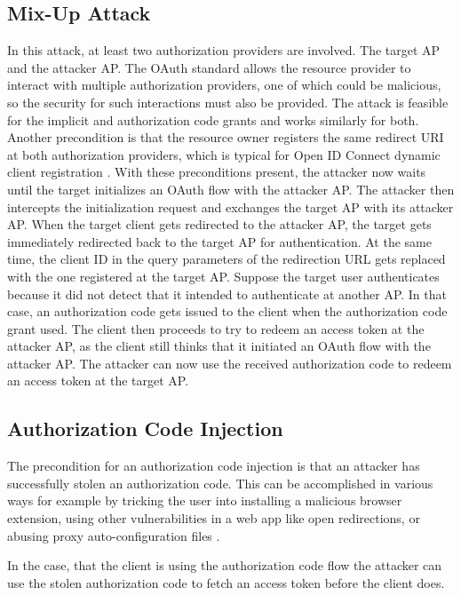 \documentclass[
    fontsize=12pt,
    headings=small,
    parskip=half,           %
    bibliography=totoc,
    numbers=noenddot,       %
    open=any,               %
    ]{scrreprt}
\begin{document}
\subsection{Mix-Up Attack}
\label{subsec:mix_up}
In this attack, at least two authorization providers are involved. The target AP and the attacker AP. The OAuth standard allows the resource provider to interact with multiple authorization providers, one of which could be malicious, so the security for such interactions must also be provided. The attack is feasible for the implicit and authorization code grants and works similarly for both. Another precondition is that the resource owner registers the same redirect URI at both authorization providers, which is typical for Open ID Connect dynamic client registration \cite{hosseyni2023formal}. With these preconditions present, the attacker now waits until the target initializes an OAuth flow with the attacker AP. The attacker then intercepts the initialization request and exchanges the target AP with its attacker AP. When the target client gets redirected to the attacker AP, the target gets immediately redirected back to the target AP for authentication. At the same time, the client ID in the query parameters of the redirection URL gets replaced with the one registered at the target AP. Suppose the target user authenticates because it did not detect that it intended to authenticate at another AP. In that case, an authorization code gets issued to the client when the authorization code grant used. The client then proceeds to try to redeem an access token at the attacker AP, as the client still thinks that it initiated an OAuth flow with the attacker AP. The attacker can now use the received authorization code to redeem an access token at the target AP. \cite{fett2016comprehensive}

\subsection{Authorization Code Injection \cite{philippaerts2022oauch}} 
The precondition for an authorization code injection is that an attacker has
successfully stolen an authorization code. This can be accomplished in various
ways for example by tricking the user into installing a malicious browser
extension, using other vulnerabilities in a web app like open redirections, or
abusing proxy auto-configuration files \cite*{philippaerts2022oauch}.

In the case, that the client is using the authorization code flow the attacker
can use the stolen authorization code to fetch an access token before the
client does.
\end{document}
